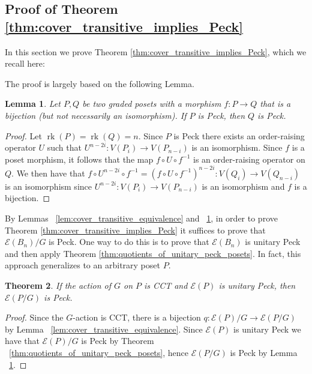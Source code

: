 \documentclass[smallextended, envcountsame, numbook]{svjour3}
\theoremstyle{plain}
\newtheorem{thm}{Theorem}[section]
\newtheorem{lem}[thm]{Lemma}
\theoremstyle{definition}
\theoremstyle{remark}
\numberwithin{equation}{section}
\newcommand\ssec{\subsection}
\newcommand\rk{\operatorname{rk}}
\begin{document}
\ssec{Proof of Theorem \ref{thm:cover_transitive_implies_Peck}}\label{ssec:proof_of_cover_transitive_implies_Peck}

In this section we prove Theorem \ref{thm:cover_transitive_implies_Peck}, which we recall here:

\cctpeck*

The proof is largely based on the following Lemma.

\begin{lem}\label{lem:bijection_peck_implication}
Let $P,Q$ be two graded posets with a morphism $f\colon P\rightarrow Q$ that is a bijection (but not necessarily an isomorphism). If $P$ is Peck, then $Q$ is Peck.
\end{lem}
\begin{proof}
Let $\rk(P) = \rk(Q) = n$.  Since $P$ is Peck there exists an order-raising operator $U$ such that $U^{n-2i}\colon V(P_i)\rightarrow V(P_{n-i})$ is an isomorphism.  Since $f$ is a poset morphism, it follows that the map $f\circ U\circ f^{-1}$ is an order-raising operator on $Q$.  We then have that $f\circ U^{n-2i}\circ f^{-1} = \left(f\circ U\circ f^{-1}\right)^{n-2i}\colon V(Q_i)\rightarrow V(Q_{n-i})$ is an isomorphism since $U^{n-2i}\colon V(P_i)\rightarrow V(P_{n-i})$ is an isomorphism and $f$ is a bijection.

\end{proof}

By Lemmas ~\ref{lem:cover_transitive_equivalence} and ~\ref{lem:bijection_peck_implication}, in order to prove Theorem \ref{thm:cover_transitive_implies_Peck} it suffices to prove that $\mathcal E(B_n)/G$ is Peck.  One way to do this is to prove that $\mathcal E(B_n)$ is unitary Peck and then apply Theorem \ref{thm:quotients_of_unitary_peck_posets}.  In fact, this approach generalizes to an arbitrary poset $P$.

\begin{thm}
\label{edge_unitary_peck_quotient}
If the action of $G$ on $P$ is CCT and $\mathcal E(P)$ is unitary Peck, then $\mathcal E(P/G)$ is Peck.
\end{thm}
\begin{proof}
Since the $G$-action is CCT, there is a bijection $q\colon\mathcal{E}(P)/G \rightarrow \mathcal{E}(P/G)$ by Lemma ~\ref{lem:cover_transitive_equivalence}.  Since $\mathcal{E}(P)$ is unitary Peck we have that $\mathcal{E}(P)/G$ is Peck by Theorem ~\ref{thm:quotients_of_unitary_peck_posets}, hence $\mathcal{E}(P/G)$ is Peck by Lemma ~\ref{lem:bijection_peck_implication}.
\end{proof}
\end{document}
